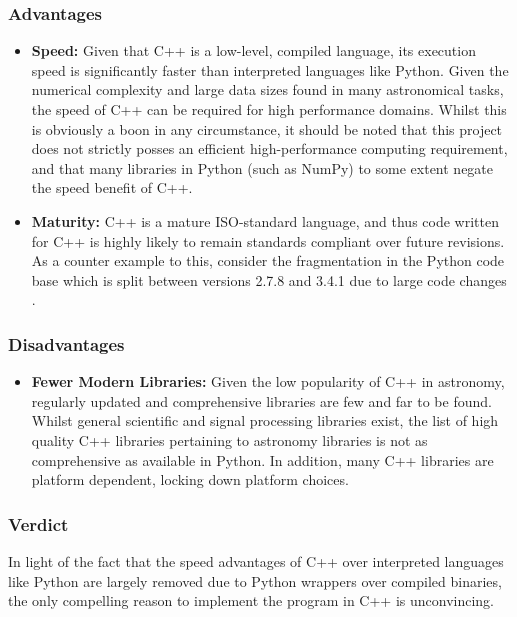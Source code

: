 \documentclass[titlesmallcaps, examinerscopy, copyrightpage]{uqthesis}
\begin{document}
\subsubsection{Advantages}
\begin{itemize}

\item \textbf{Speed:} Given that C++ is a low-level, compiled language, its execution speed is significantly faster than interpreted languages like Python. Given the numerical complexity and large data sizes found in many astronomical tasks, the speed of C++ can be required for high performance domains. Whilst this is obviously a boon in any circumstance, it should be noted that this project does not strictly posses an efficient high-performance computing requirement, and that many libraries in Python (such as NumPy) to some extent negate the speed benefit of C++.

\item \textbf{Maturity:} C++ is a mature ISO-standard language, and thus code written for C++ is highly likely to remain standards compliant over future revisions. As a counter example to this, consider the fragmentation in the Python code base which is split between versions 2.7.8 and 3.4.1 due to large code changes \cite{pythonDownload}.
\end{itemize}

\subsubsection{Disadvantages}
\begin{itemize}

\item \textbf{Fewer Modern Libraries:} Given the low popularity of C++ in astronomy, regularly updated and comprehensive libraries are few and far to be found. Whilst general scientific and signal processing libraries exist, the list of high quality C++ libraries pertaining to astronomy libraries is not as comprehensive as available in Python. In addition, many C++ libraries are platform dependent, locking down platform choices.

\end{itemize}

\subsubsection{Verdict}
In light of the fact that the speed advantages of C++ over interpreted languages like Python are largely removed due to Python wrappers over compiled binaries, the only compelling reason to implement the program in C++ is unconvincing.
\end{document}
